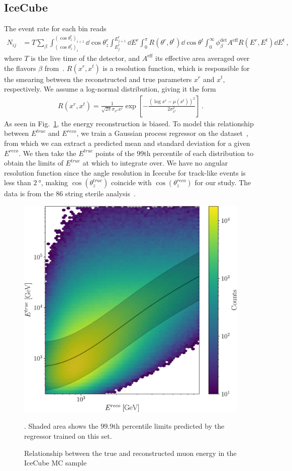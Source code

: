 \documentclass[draft=True]{revtex4-2}
\newcommand{\zreco}{\ensuremath{\cos{(\theta_z^{reco})}}}
\newcommand{\ztrue}{\ensuremath{\cos{(\theta_z^{true})}}}
\newcommand{\Ereco}{E^{reco}}
\newcommand{\Etrue}{E^{true}}
\begin{document}
\subsection{IceCube}\label{ch:ICmethod}
The event rate for each bin reads
\begin{align}\label{eq:ICevents}
   N_{ij} &= T\sum_\beta \int_{(\cos{\theta_z^r})_i}^{(\cos{\theta_z^r})_{i+1}} \dd \cos{\theta^r_z} \int_{E^r_{j}}^{E^r_{j+1}} \dd E^r \int_0^\pi R(\theta^r,\theta^t) \dd \cos{\theta^t} \int_0^\infty \phi_\beta^\text{det}  A^\text{eff} R(E^r,E^t) 
   \dd E^t\,,
\end{align}
where $T$ is the live time of the detector, and $A^\text{eff}$ its effective area averaged over the flavors $\beta$ from~\cite{ICaeff}. $R(x^r,x^t)$ is a resolution function, 
which is responsible for the smearing between the reconstructed and true parameters $x^r$ and $x^t$, respectively. We assume a log-normal distribution, giving it the form 
\begin{align}
    R(x^r, x^t) = \frac{1}{\sqrt{2\pi} \sigma_{x^r}x^r} \exp\left[-\frac{(\log x^r-\mu(x^t))^2}{2\sigma_{x^r}^2}\right]\,.
\end{align}
As seen in Fig.~\ref{fig:IC_MC_counts}, the energy reconstruction is biased. To model this relationship between $\Etrue$ and $\Ereco$, we train a Gaussian process regressor on the dataset~\cite{IC2016}, from which
we can extract a predicted mean and standard deviation for a given $E^{reco}$. We then take the $\Etrue$ points of the 99th percentile of each distribution to obtain
the limits of $\Etrue$ at which to integrate over. We have no angular resolution function since the angle resolution in Icecube for track-like events is less than $\SI{2}{\degree}$, making $\ztrue$ coincide with $\zreco$ for our study. 
The data is from the 86 string sterile analysis~\cite{IC2020}.
\begin{figure}[!tb]
    \begin{center}
       \includegraphics[width=0.4\linewidth]{figures/IC_MC_gpr.pdf} %
    \end{center}
    \caption{Relationship between the true and reconstructed muon energy in the IceCube MC sample~\cite{IC2016}}\label{fig:IC_MC_counts}. Shaded area shows the $99.9$th percentile limits predicted by the regressor trained on this set.
 \end{figure}
\end{document}
